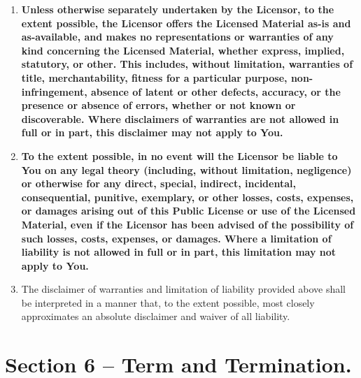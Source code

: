 \begin{enumerate}[label=\alph*.]
  \item \textbf{Unless otherwise separately undertaken by the Licensor, to the extent possible, the Licensor offers the Licensed Material as-is and as-available, and makes no representations or warranties of any kind concerning the Licensed Material, whether express, implied, statutory, or other. This includes, without limitation, warranties of title, merchantability, fitness for a particular purpose, non-infringement, absence of latent or other defects, accuracy, or the presence or absence of errors, whether or not known or discoverable. Where disclaimers of warranties are not allowed in full or in part, this disclaimer may not apply to You.}

  \item \textbf{To the extent possible, in no event will the Licensor be liable to You on any legal theory (including, without limitation, negligence) or otherwise for any direct, special, indirect, incidental, consequential, punitive, exemplary, or other losses, costs, expenses, or damages arising out of this Public License or use of the Licensed Material, even if the Licensor has been advised of the possibility of such losses, costs, expenses, or damages. Where a limitation of liability is not allowed in full or in part, this limitation may not apply to You.}

  \item The disclaimer of warranties and limitation of liability provided above shall be interpreted in a manner that, to the extent possible, most closely approximates an absolute disclaimer and waiver of all liability.
\end{enumerate}

\section{Section 6 – Term and Termination.}
\label{section6}

